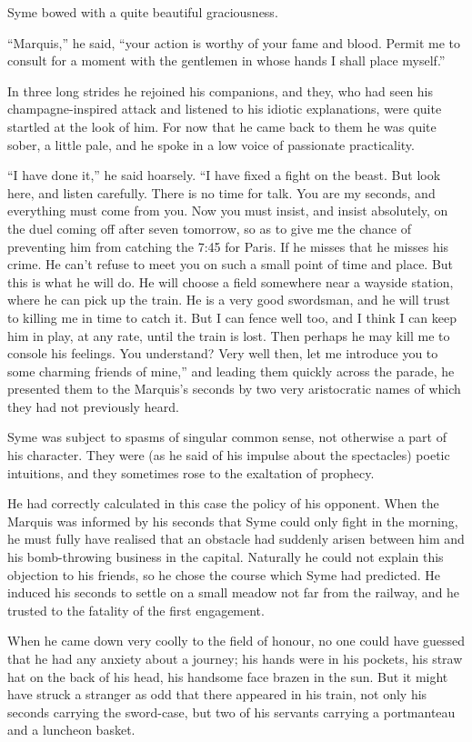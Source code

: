 Syme bowed with a quite beautiful graciousness.

“Marquis,” he said, “your action is worthy of your fame and blood. Permit me to consult for a moment with the gentlemen in whose hands I shall place myself.”

In three long strides he rejoined his companions, and they, who had seen his champagne-inspired attack and listened to his idiotic explanations, were quite startled at the look of him. For now that he came back to them he was quite sober, a little pale, and he spoke in a low voice of passionate practicality.

“I have done it,” he said hoarsely. “I have fixed a fight on the beast. But look here, and listen carefully. There is no time for talk. You are my seconds, and everything must come from you. Now you must insist, and insist absolutely, on the duel coming off after seven tomorrow, so as to give me the chance of preventing him from catching the 7:45 for Paris. If he misses that he misses his crime. He can’t refuse to meet you on such a small point of time and place. But this is what he will do. He will choose a field somewhere near a wayside station, where he can pick up the train. He is a very good swordsman, and he will trust to killing me in time to catch it. But I can fence well too, and I think I can keep him in play, at any rate, until the train is lost. Then perhaps he may kill me to console his feelings. You understand? Very well then, let me introduce you to some charming friends of mine,” and leading them quickly across the parade, he presented them to the Marquis’s seconds by two very aristocratic names of which they had not previously heard.

Syme was subject to spasms of singular common sense, not otherwise a part of his character. They were (as he said of his impulse about the spectacles) poetic intuitions, and they sometimes rose to the exaltation of prophecy.

He had correctly calculated in this case the policy of his opponent. When the Marquis was informed by his seconds that Syme could only fight in the morning, he must fully have realised that an obstacle had suddenly arisen between him and his bomb-throwing business in the capital. Naturally he could not explain this objection to his friends, so he chose the course which Syme had predicted. He induced his seconds to settle on a small meadow not far from the railway, and he trusted to the fatality of the first engagement.

When he came down very coolly to the field of honour, no one could have guessed that he had any anxiety about a journey; his hands were in his pockets, his straw hat on the back of his head, his handsome face brazen in the sun. But it might have struck a stranger as odd that there appeared in his train, not only his seconds carrying the sword-case, but two of his servants carrying a portmanteau and a luncheon basket.

